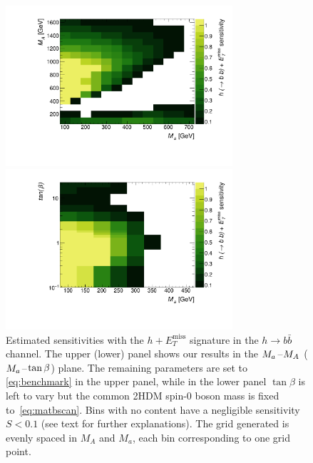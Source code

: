 \documentclass[a4paper, 11pt,notoc]{article}
\newcommand{\MET}{\ensuremath{E_T^\mathrm{miss}}\xspace}
\newcommand{\mA}{\ensuremath{M_{A}}\xspace}
\newcommand{\ma}{\ensuremath{M_{a}}\xspace}
\begin{document}
\begin{figure}[t!]
\centering
\includegraphics[width=0.75\textwidth]{monoHbb_sensi_sum_bins_1_2_3_4_ma_vs_mA_lin.pdf}

\vspace{2mm}

\includegraphics[width=0.75\textwidth]{monoHbb_sensi_sum_bins_1_2_3_4_ma_vs_tanb_lin.pdf}
\vspace{2mm}
\caption{Estimated sensitivities with the $h+\MET$ signature in the $h \to b \bar b$ channel. The upper (lower) panel shows our results in the $\ma\hspace{0.25mm}$--$\hspace{0.25mm}\mA$ ($\ma\hspace{0.25mm}$--$\hspace{0.25mm}\tan \beta$) plane.  The remaining parameters are set to \eqref{eq:benchmark} in the upper panel, while in the lower panel $\tan \beta$ is left to vary but the common 2HDM  spin-0 boson  mass is fixed to~\eqref{eq:matbscan}. Bins with no content have a negligible sensitivity $S<0.1$ (see text for further explanations). The grid generated is evenly spaced in \mA and \ma, each bin corresponding to one grid point.}
\label{fig:monoHbb_sensi}
\end{figure}
\end{document}
